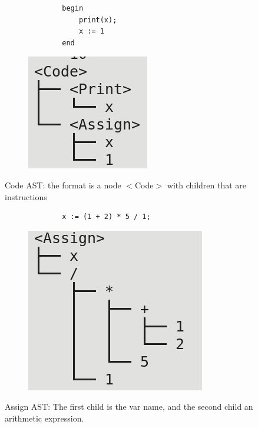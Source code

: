 \documentclass[letterpaper]{article}
\begin{document}
\begin{figure}[H]
    \begin{subfigure}{.5\textwidth}
        \begin{lstlisting}
        begin
            print(x);
            x := 1
        end
        \end{lstlisting}
    \end{subfigure}
    \begin{subfigure}{.5\textwidth}
    \includegraphics[scale=0.5]{image/code.png}
    \end{subfigure}
    \caption{Code AST: the format is a node $<$Code$>$ with children
    that are instructions}
\end{figure}

\begin{figure}[H]
    \begin{subfigure}{.5\textwidth}
        \begin{lstlisting}
        x := (1 + 2) * 5 / 1;
        \end{lstlisting}
    \end{subfigure}
    \begin{subfigure}{.5\textwidth}
    \includegraphics[scale=0.5]{image/assign.png}
\end{subfigure}
    \caption{Assign AST: The first child is the var name, and the second
    child an arithmetic expression.}
\end{figure}
\end{document}
